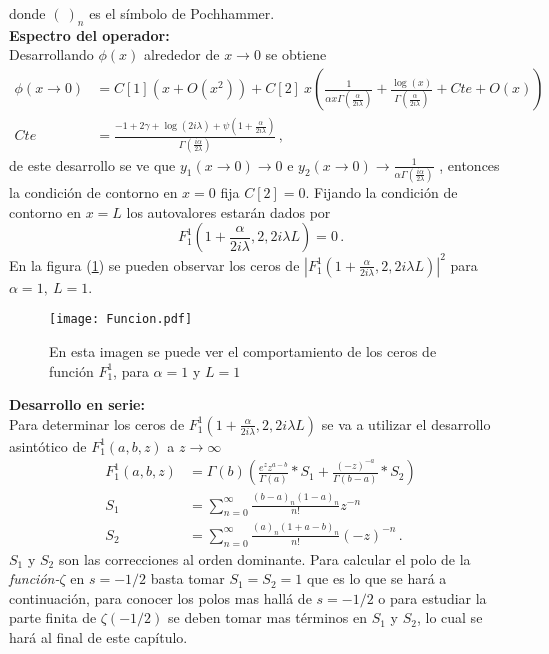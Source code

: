 donde $( \   ) _n$ es el símbolo de Pochhammer. \\



\textbf{Espectro del operador:} \\

Desarrollando $\phi (x)$ alrededor de $x \rightarrow 0$ se obtiene
\begin{align}
\phi (x \rightarrow 0) &=
C[1] ( x + O(x ^2)) + 
C[2] \ x 
\left( 
\frac{1}{  \alpha x  \Gamma ( \frac{ \alpha}{2 i \lambda}  )   }  +
\frac{\log (x) }{\Gamma ( \frac{ \alpha}{2 i \lambda} ) } + Cte + O(x)
\right)
	\nonumber
\\[10pt]
Cte &= 
\frac{
-1 + 2 \gamma + \log ( 2  i \lambda ) + \psi (1 + \frac{ \alpha}{2 i \lambda})
}
{\Gamma (\frac{i \alpha}{2 \lambda})}
\, ,
\label{eq.scat}
\end{align}
de este desarrollo se ve que $y _1 (x \rightarrow 0 ) \rightarrow 0$ e $y _2 (x \rightarrow 0)  \rightarrow
\frac{1}{  \alpha   \Gamma ( \frac{i \alpha}{2 \lambda}  )   } $ , entonces la condición de contorno en $x=0$ fija $C[2] =0$.
Fijando la condición de contorno en $x=L$ los autovalores estarán dados por
\begin{equation}
F _1 ^1 (1+\frac{ \alpha}{2 i \lambda},2,2 i \lambda L)  = 0
	\, .
\label{eq.1}
\end{equation}
En la figura (\ref{fig:funcion}) se pueden observar los ceros de 
\mbox{$ | F _1 ^1 (1+\frac{ \alpha}{2 i \lambda},2,2 i \lambda L) | ^2 $} para   $\alpha=1, \ L=1$. \\

\begin{figure}[h!]
\centering
\texttt{[image: Funcion.pdf]}
\caption{En esta imagen se puede ver el comportamiento de los ceros de función $F _1 ^1$, para $\alpha=1$ y $L=1$}
\label{fig:funcion}
\end{figure}

\textbf{Desarrollo en serie:} \\

Para determinar los ceros de $F _1 ^1 (1+\frac{ \alpha}{2 i \lambda},2,2 i \lambda L) $ se va a utilizar el desarrollo asintótico de $F _1 ^1 (a,b,z)$ a $z \rightarrow \infty$
\begin{equation}
\begin{aligned}
    F _1 ^1 (a,b,z) &= \Gamma (b) 
    \left(
    \frac{e^z z ^{a-b} }{\Gamma(a)} * S_1 + \frac{(-z) ^{ -a}}{ \Gamma(b-a)} 
    * S_2
    \right) \\[5pt]
    S _1 &= \sum _{n=0} ^{\infty} \frac{(b-a) _n (1-a) _n}{n!} z ^{-n} \\[5pt]
    S _2 &= \sum _{n=0} ^{\infty} \frac{(a) _n (1+a-b) _n}{n!} (-z) ^{-n}     
		\, .
\end{aligned}
\label{eq.aprox}
\end{equation}
$S_1$ y $S _2$ son las correcciones al orden dominante. Para calcular el polo de la {\it función-$\zeta$} en $s=-1/2$ basta tomar $S _1 = S _2 = 1$ que es lo que se hará a continuación, para conocer los polos mas hallá de $s=-1/2$ o para estudiar la parte finita de $\zeta (-1/2)$ se deben tomar mas términos en $S_1$ y $S _2$, lo cual se hará al final de este capítulo.

